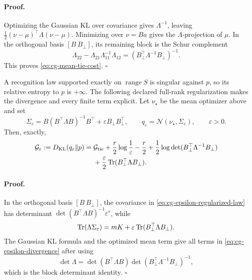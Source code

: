 \paragraph{Proof.}
Optimizing the Gaussian KL over covariance gives
\(\Lambda^{-1}\), leaving
\(\frac12(\nu-\mu)^\top\Lambda(\nu-\mu)\). Minimizing over
\(\nu=Ba\) gives the \(\Lambda\)-projection of \(\mu\). In the orthogonal
basis \([B\ B_\perp]\), its remaining block is the Schur complement
\[
\Lambda_{22}-\Lambda_{21}\Lambda_{11}^{-1}\Lambda_{12}
=\left(B_\perp^\top\Lambda^{-1}B_\perp\right)^{-1}.
\]
This proves \eqref{eq:cg-mean-tie-cost}. \(\square\)

A recognition law supported exactly on \(\operatorname{range}S\) is singular
against \(p\), so its relative entropy to \(p\) is \(+\infty\). The following
declared full-rank regularization makes the divergence and every finite term
explicit. Let \(\nu_\star\) be the mean optimizer above and set
\begin{equation}
\Sigma_\varepsilon
=B(B^\top\Lambda B)^{-1}B^\top
+\varepsilon B_\perp B_\perp^\top,
\qquad
q_\varepsilon=\mathcal N(\nu_\star,\Sigma_\varepsilon),
\qquad \varepsilon>0.
\label{eq:cg-epsilon-regularized-law}
\end{equation}
Then, exactly,
\begin{equation}
\begin{aligned}
\mathcal G_\varepsilon
:=D_{\mathrm{KL}}(q_\varepsilon\Vert p)
={}&\mathcal G_{\rm tie}
+\frac{r}{2}\log\frac1\varepsilon-\frac r2
+\frac12\log\det(B_\perp^\top\Lambda^{-1}B_\perp)\\
&+\frac{\varepsilon}{2}
\operatorname{Tr}(B_\perp^\top\Lambda B_\perp).
\end{aligned}
\label{eq:cg-epsilon-divergence}
\end{equation}

\paragraph{Proof.}
In the orthogonal basis \([B\ B_\perp]\), the covariance in
\eqref{eq:cg-epsilon-regularized-law} has determinant
\(\det(B^\top\Lambda B)^{-1}\varepsilon^r\), while
\[
\operatorname{Tr}(\Lambda\Sigma_\varepsilon)
=mK+\varepsilon\operatorname{Tr}(B_\perp^\top\Lambda B_\perp).
\]
The Gaussian KL formula and the optimized mean term give all terms in
\eqref{eq:cg-epsilon-divergence} after using
\[
\det\Lambda
=\det(B^\top\Lambda B)
\det\left(B_\perp^\top\Lambda^{-1}B_\perp\right)^{-1},
\]
which is the block determinant identity. \(\square\)

